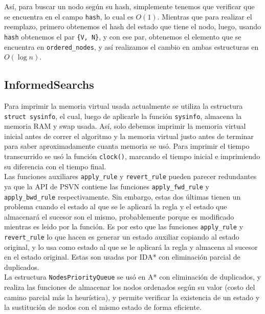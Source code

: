 \documentclass[a4paper,10pt]{article}
\begin{document}
    As\'i, para buscar un nodo seg\'un su hash, simplemente tenemos que verificar
    que se encuentra en el campo \verb|hash|, lo cual es $O(1)$. Mientras que 
    para realizar el reemplazo, primero obtenemos el hash del estado que tiene 
    el nodo, luego, usando \verb|hash| obtenemos el par \verb|{V, N}|, y con ese 
    par, obtenemos el elemento que se encuentra en \verb|ordered_nodes|, y as\'i 
    realizamos el cambio en ambas estructuras en $O(\log n)$.

  
  \subsection{InformedSearchs}
    Para imprimir la memoria virtual usada actualmente se utiliza la estructura 
    \verb|struct sysinfo|, el cual, luego de aplicarle la funci\'on \verb|sysinfo|,
    almacena la memoria RAM y swap usada. As\'i, solo debemos imprimir la memoria 
    virtual inicial antes de correr el algoritmo y la memoria virtual justo antes 
    de terminar para saber aproximadamente cuanta memoria se us\'o. Para imprimir 
    el tiempo transcurrido se us\'o la funci\'on \verb|clock()|, marcando el tiempo 
    inicial e imprimiendo su diferencia con el tiempo final. \\

    Las funciones auxiliares \verb|apply_rule| y \verb|revert_rule| pueden parecer
    redundantes ya que la API de PSVN contiene las funciones \verb|apply_fwd_rule|
    y \verb|apply_bwd_rule| respectivamente. Sin embargo, estas dos \'ultimas tienen
    un problema cuando el estado al que se le aplicar\'a la regla y el estado que 
    almacenar\'a el sucesor son el mismo, probablemente porque es modificado mientras 
    es leido por la funci\'on. Es por esto que las funciones \verb|apply_rule| y 
    \verb|revert_rule| lo que hacen es generar un estado auxiliar copiando al estado 
    original, y lo usa como estado al que se le aplicar\'a la regla y almacena al 
    sucesor en el estado original. Estas son usadas por IDA* con eliminaci\'on parcial 
    de duplicados. \\

    La estructura \verb|NodesPriorityQueue| se us\'o en A* con eliminaci\'on de 
    duplicados, y realiza las funciones de almacenar los nodos ordenados seg\'un su 
    valor (costo del camino parcial m\'as la heur\'istica), y permite verificar la 
    existencia de un estado y la sustituci\'on de nodos con el mismo estado de forma 
    eficiente. \\
\end{document}
